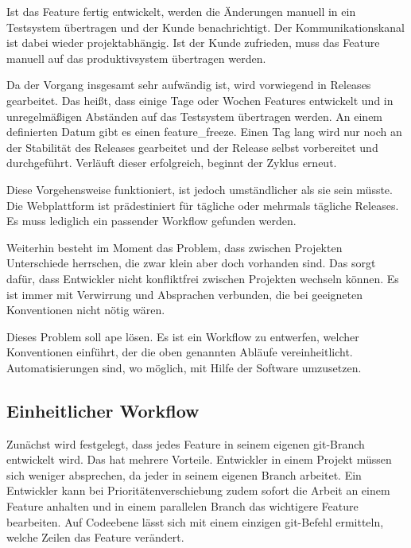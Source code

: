 Ist das Feature fertig entwickelt, werden die Änderungen manuell in ein Testsystem übertragen und der Kunde benachrichtigt. Der Kommunikationskanal ist dabei wieder projektabhängig. Ist der Kunde zufrieden, muss das Feature manuell auf das \gls{produktivsystem} übertragen werden.

Da der Vorgang insgesamt sehr aufwändig ist, wird vorwiegend in Releases gearbeitet. Das heißt, dass einige Tage oder Wochen Features entwickelt und in unregelmäßigen Abständen auf das Testsystem übertragen werden. An einem definierten Datum gibt es einen \gls{feature_freeze}. Einen Tag lang wird nur noch an der Stabilität des Releases gearbeitet und der Release selbst vorbereitet und durchgeführt. Verläuft dieser erfolgreich, beginnt der Zyklus erneut.

Diese Vorgehensweise funktioniert, ist jedoch umständlicher als sie sein müsste. Die Webplattform ist prädestiniert für tägliche oder mehrmals tägliche Releases. Es muss lediglich ein passender Workflow gefunden werden.

Weiterhin besteht im Moment das Problem, dass zwischen Projekten Unterschiede herrschen, die zwar klein aber doch vorhanden sind. Das sorgt dafür, dass Entwickler nicht konfliktfrei zwischen Projekten wechseln können. Es ist immer mit Verwirrung und Absprachen verbunden, die bei geeigneten Konventionen nicht nötig wären.

Dieses Problem soll \gls{ape} lösen. Es ist ein Workflow zu entwerfen, welcher Konventionen einführt, der die oben genannten Abläufe vereinheitlicht. Automatisierungen sind, wo möglich, mit Hilfe der Software umzusetzen.


\subsection{Einheitlicher Workflow} %
\label{sub:einheitlicher_workflow}

Zunächst wird festgelegt, dass jedes Feature in seinem eigenen \gls{git}-Branch entwickelt wird. Das hat mehrere Vorteile. Entwickler in einem Projekt müssen sich weniger absprechen, da jeder in seinem eigenen Branch arbeitet. Ein Entwickler kann bei Prioritätenverschiebung zudem sofort die Arbeit an einem Feature anhalten und in einem parallelen Branch das wichtigere Feature bearbeiten. Auf Codeebene lässt sich mit einem einzigen \gls{git}-Befehl ermitteln, welche Zeilen das Feature verändert.

